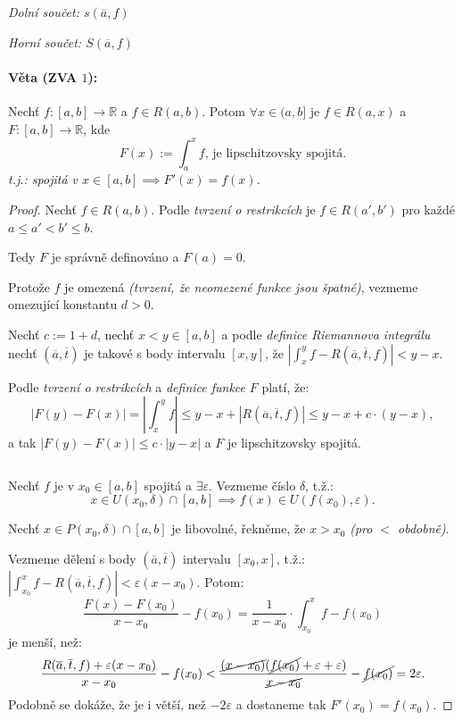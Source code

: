 \documentclass[10pt,a4paper]{article}
\newcommand{\R}{{\mathbb{R}}}
\begin{document}
\textit{Dolní součet: $s(\overline{a}, f)$}

\textit{Horní součet: $S(\overline{a}, f)$}

\paragraph*{Věta (ZVA $1$):} Nechť $f:[a,b] \to \R$ a $f\in R(a,b)$. Potom $\forall x\in (a,b]$ je $f\in R(a,x)$ a $F:[a,b] \to \R$, kde
\[
    F(x):= \int_{a}^{x} f \text{, je lipschitzovsky spojitá.}
\] \textit{t.j.: spojitá v $x\in [a,b] \implies F'(x) = f(x)$.}

\begin{proof}
    Nechť $f \in R(a, b)$. Podle \textit{tvrzení o restrikcích} je $f \in R(a', b')$ pro každé $a \leq a' < b' \leq b$. 
    
    Tedy $F$ je správně definováno a $F(a) = 0$. 
    
    Protože $f$ je omezená \textit{(tvrzení, že neomezené funkce jsou špatné)}, vezmeme omezující konstantu $d > 0$.

    Nechť $c := 1 + d$, nechť $x < y \in [a, b]$ a podle \textit{definice Riemannova integrálu} nechť $(\overline{a}, \overline{t})$ je takové s body intervalu $[x, y]$, 
    že $\displaystyle \left |\int_{x}^{y}f-R(\overline{a}, \overline{t}, f)\right|<y-x$.
    
    Podle \textit{tvrzení o restrikcích} a \textit{definice funkce} $F$ platí, že:
    \[
        |F(y) - F (x)| = \left|\int_{x}^{y} f \right| \leq y-x + |R(\overline{a}, \overline{t}, f)|\leq y-x + c\cdot (y-x),
    \] a tak $|F(y) - F(x)| \leq c\cdot |y-x|$ a $F$ je lipschitzovsky spojitá.

    $ $

    Nechť $f$ je v $x_0 \in [a, b]$ spojitá a $\exists \varepsilon$. Vezmeme číslo $\delta$, t.ž.: 
    $$x \in U(x_0, \delta) \cap [a, b] \implies f(x) \in U(f(x_0), \varepsilon).$$
    
    Nechť $x \in P(x_0, \delta) \cap [a,b]$ je libovolné, řekněme, že $x>x_0$ \textit{(pro $<$ obdobně)}.

    Vezmeme dělení s body $(\overline{a}, \overline{t})$ intervalu $[x_0, x]$, t.ž.: $\displaystyle \left|\int_{x_0}^{x}f-R(\overline{a}, \overline{t}, f)\right| < \varepsilon(x-x_0)$.
    Potom: \[
        \frac{F(x) - F(x_0)}{x-x_0} - f(x_0) = \frac{1}{x-x_0} \cdot \int_{x_0}^{x} f-f(x_0)
    \] je menší, než:
    \[
        \frac{R(\overline{a}, \overline{t}, f) + \varepsilon(x-x_0)}{x-x_0}-f(x_0) < \frac{\cancel{(x-x_0)}(\cancel{f(x_0)} + \varepsilon + \varepsilon)}{\cancel{x-x_0}} - \cancel{f(x_0)} = 2\varepsilon.
    \] Podobně se dokáže, že je i větší, než $-2\varepsilon$ a dostaneme tak $F'(x_0) = f(x_0)$.

\end{proof}
\end{document}
